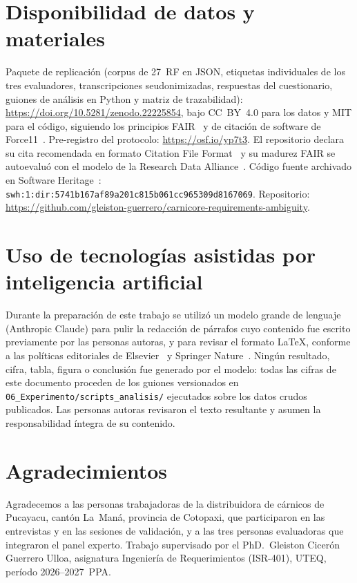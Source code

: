\documentclass[runningheads]{llncs}
\begin{document}
\section*{Disponibilidad de datos y materiales}

Paquete de replicación (corpus de 27~RF en JSON, etiquetas individuales de los
tres evaluadores, transcripciones seudonimizadas, respuestas del cuestionario,
guiones de análisis en Python y matriz de trazabilidad):
\url{https://doi.org/10.5281/zenodo.22225854}, bajo CC~BY~4.0 para los datos y
MIT para el código, siguiendo los principios FAIR~\cite{wilkinson2016fair} y de
citación de software de Force11~\cite{smith2016software}.
Pre-registro del protocolo: \url{https://osf.io/yp7t3}.
El repositorio declara su cita recomendada en formato Citation File
Format~\cite{druskat2021cff} y su madurez FAIR se autoevaluó con el modelo de
la Research Data Alliance~\cite{rda2020fair}. Código fuente archivado en
Software Heritage~\cite{dicosmo2020referencing,dicosmo2017swh}:
\texttt{swh:1:dir:5741b167af89a201c815b061cc965309d8167069}.
Repositorio: \url{https://github.com/gleiston-guerrero/carnicore-requirements-ambiguity}.

\section*{Uso de tecnologías asistidas por inteligencia artificial}

Durante la preparación de este trabajo se utilizó un modelo grande de lenguaje
(Anthropic Claude) para pulir la redacción de párrafos cuyo contenido fue
escrito previamente por las personas autoras, y para revisar el formato
\LaTeX{}, conforme a las políticas editoriales de
Elsevier~\cite{elsevier2023ai} y Springer Nature~\cite{springer2023ai}. Ningún
resultado, cifra, tabla, figura o conclusión fue generado por el modelo: todas
las cifras de este documento proceden de los guiones versionados en
\texttt{06\_Experimento/scripts\_analisis/} ejecutados sobre los datos crudos
publicados. Las personas autoras revisaron el texto resultante y asumen la
responsabilidad íntegra de su contenido.

\section*{Agradecimientos}

Agradecemos a las personas trabajadoras de la distribuidora de cárnicos de
Pucayacu, cantón La~Man\'{a}, provincia de Cotopaxi, que participaron en las
entrevistas y en las sesiones de validación, y a las tres personas evaluadoras
que integraron el panel experto. Trabajo supervisado por el PhD.\ Gleiston
Cicer\'{o}n Guerrero Ulloa, asignatura Ingeniería de Requerimientos (ISR-401),
UTEQ, período 2026--2027~PPA.



\end{document}
